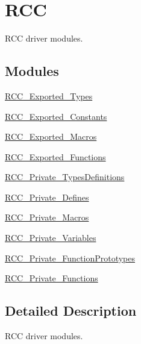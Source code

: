 \hypertarget{group___r_c_c}{}\section{R\+CC}
\label{group___r_c_c}


R\+CC driver modules.  


\subsection*{Modules}
\begin{DoxyCompactItemize}
\item 
\mbox{\hyperlink{group___r_c_c___exported___types}{R\+C\+C\+\_\+\+Exported\+\_\+\+Types}}
\item 
\mbox{\hyperlink{group___r_c_c___exported___constants}{R\+C\+C\+\_\+\+Exported\+\_\+\+Constants}}
\item 
\mbox{\hyperlink{group___r_c_c___exported___macros}{R\+C\+C\+\_\+\+Exported\+\_\+\+Macros}}
\item 
\mbox{\hyperlink{group___r_c_c___exported___functions}{R\+C\+C\+\_\+\+Exported\+\_\+\+Functions}}
\item 
\mbox{\hyperlink{group___r_c_c___private___types_definitions}{R\+C\+C\+\_\+\+Private\+\_\+\+Types\+Definitions}}
\item 
\mbox{\hyperlink{group___r_c_c___private___defines}{R\+C\+C\+\_\+\+Private\+\_\+\+Defines}}
\item 
\mbox{\hyperlink{group___r_c_c___private___macros}{R\+C\+C\+\_\+\+Private\+\_\+\+Macros}}
\item 
\mbox{\hyperlink{group___r_c_c___private___variables}{R\+C\+C\+\_\+\+Private\+\_\+\+Variables}}
\item 
\mbox{\hyperlink{group___r_c_c___private___function_prototypes}{R\+C\+C\+\_\+\+Private\+\_\+\+Function\+Prototypes}}
\item 
\mbox{\hyperlink{group___r_c_c___private___functions}{R\+C\+C\+\_\+\+Private\+\_\+\+Functions}}
\end{DoxyCompactItemize}


\subsection{Detailed Description}
R\+CC driver modules. 

